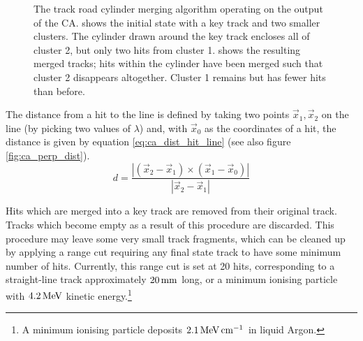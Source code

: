 \begin{figure}
\centering
{}
\caption[Track road merging algorithm operating on clustered hits]{\label{fig:ca_merging_cylinder}The track road cylinder merging algorithm operating on the output of the \ac{CA}.  shows the initial state with a key track and two smaller clusters. The cylinder drawn around the key track encloses all of cluster 2, but only two hits from cluster 1.  shows the resulting merged tracks; hits within the cylinder have been merged such that cluster 2 disappears altogether. Cluster 1 remains but has fewer hits than before.}
\end{figure}

The distance from a hit to the line is defined by taking two points $\vec{x}_1, \vec{x}_2$ on the line (by picking two values of $\lambda$) and, with $\vec{x}_0$ as the coordinates of a hit, the distance is given by equation \ref{eq:ca_dist_hit_line} (see also figure \ref{fig:ca_perp_dist}).
\begin{equation}\label{eq:ca_dist_hit_line}
d = \frac{|(\vec{x}_2 - \vec{x}_1) \times (\vec{x}_1 - \vec{x}_0)|}{|\vec{x}_2 - \vec{x}_1|}
\end{equation}

Hits which are merged into a key track are removed from their original track. Tracks which become empty as a result of this procedure are discarded. This procedure may leave some very small track fragments, which can be cleaned up by applying a range cut requiring any final state track to have some minimum number of hits. Currently, this range cut is set at 20 hits, corresponding to a straight-line track approximately $20\,\mathrm{mm}$ long, or a minimum ionising particle with $4.2\,\mathrm{MeV}$ kinetic energy.\footnote{A minimum ionising particle deposits $2.1\,\mathrm{MeV} \,\mathrm{cm}^{-1}$ in liquid Argon\citep{Aprile2006}.}

